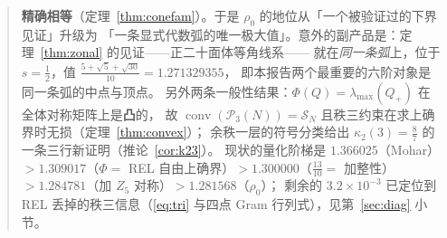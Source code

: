 \documentclass[UTF8,11pt]{ctexart}
\theoremstyle{definition}
\begin{document}
\begin{abstract}
\textbf{精确相等}（定理~\ref{thm:conefam}）。于是 $\rho_0$ 的地位从「一个被验证过的下界见证」升级为
「一条显式代数弧的唯一极大值」。意外的副产品是：定理~\ref{thm:zonal} 的见证——正二十面体等角线系——
就在\emph{同一条弧}上，位于 $s=\frac12$，值 $\frac{5+\sqrt5+\sqrt{30}}{10}=1.271329355$，
即本报告两个最重要的六阶对象是同一条弧的中点与顶点。
另外两条一般性结果：$\Phi(Q)=\lambda_{\max}(Q_+)$ 在全体对称矩阵上是\textbf{凸}的，
故 $\operatorname{conv}(\mathcal P_3(N))=\mathcal S_N$ 且秩三约束在求上确界时无损（定理~\ref{thm:convex}）；
余秩一层的符号分类给出 $\kappa_2(3)=\frac87$ 的一条三行新证明（推论~\ref{cor:k23}）。
现状的量化阶梯是
$1.366025$（Mohar）$>1.309017$（$\Phi=$ REL 自由上确界）$>1.300000$（$\frac{13}{10}=$ 加整性）
$>1.284781$（加 $Z_5$ 对称）$>1.281568$（$\rho_0$）；
剩余的 $3.2\times10^{-3}$ 已定位到 REL 丢掉的秩三信息（\eqref{eq:tri} 与四点 Gram 行列式），见第~\ref{sec:diag} 小节。


\end{abstract}
\end{document}
